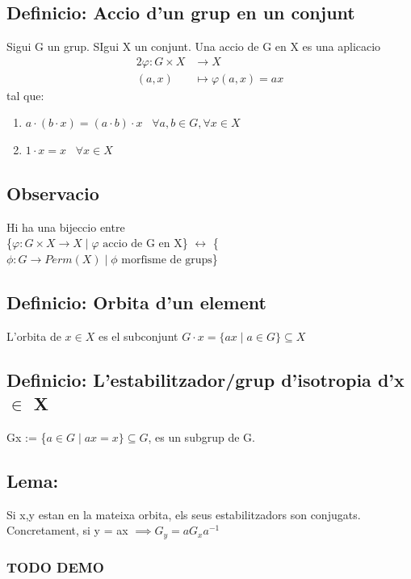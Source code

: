 \documentclass[11pt]{article}
\begin{document}
\subsection{Definicio: Accio d'un grup en un conjunt}
\label{sec:orgb00c1c5}
Sigui G un grup. SIgui X un conjunt. Una accio de G en X es una aplicacio
\begin{alignat*}{2}
\varphi : G \times X &\to X \\
(a, x) &\mapsto \varphi(a,x) = ax
\end{alignat*}
tal que:
\begin{enumerate}
\item \(a \cdot (b \cdot x) = (a \cdot b) \cdot x \hspace{10pt}  \forall a,b \in G, \forall x \in X\)
\item \(1 \cdot x = x \hspace{10pt} \forall x \in X\)
\end{enumerate}
\subsection{Observacio}
\label{sec:orgecb97fe}
Hi ha una bijeccio entre \\
\{\(\varphi: G \times X \to X \mid \varphi \text{ accio de G en X}\)\} \(\leftrightarrow\) \{\(\phi: G \to Perm(X) \mid \phi \text{ morfisme de grups}\)\}
\subsection{Definicio: Orbita d'un element}
\label{sec:orgc82e410}
L'orbita de \(x \in X\) es el subconjunt \(G \cdot x = \{ax \mid a \in G \} \subseteq X\)
\subsection{Definicio: L'estabilitzador/grup d'isotropia d'x \(\in\) X}
\label{sec:org3febc0f}
Gx := \{\(a \in G \mid ax = x \} \subseteq G\), es un subgrup de G.
\subsection{Lema:}
\label{sec:org0f6a74d}
Si x,y estan en la mateixa orbita, els seus estabilitzadors son conjugats. \\
Concretament, si y = ax \(\implies G_y = aG_{x}a^{-1}\)
\subsubsection{{\bfseries\sffamily TODO} DEMO}
\label{sec:org0b19f0b}
\end{document}
